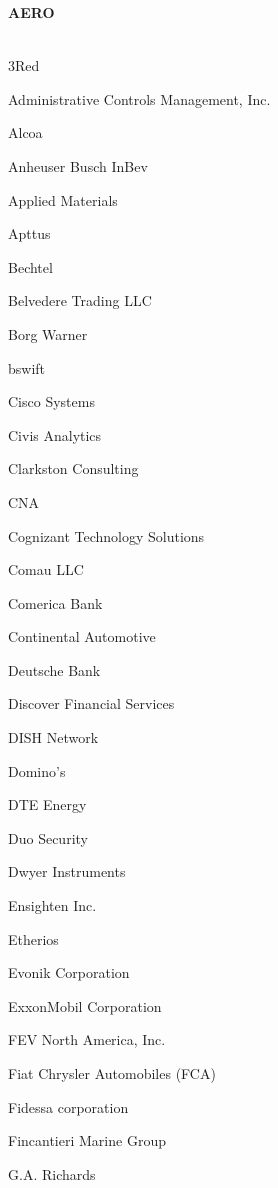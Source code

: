 \documentclass[twoside]{article}
\begin{document}
    \begin{center}\begin{multicols}{5}
    {\fontsize{14}{16}\selectfont \bf AERO}\\
        \vspace{-1em}
        ~\hrulefill~
        \vspace{-.9em}
        \begin{FlushLeft}
        \begin{compactitem}
        \item 3Red
\item Administrative Controls Management, Inc.
\item Alcoa
\item Anheuser Busch InBev
\item Applied Materials
\item Apttus
\item Bechtel
\item Belvedere Trading LLC
\item Borg Warner
\item bswift
\item Cisco Systems
\item Civis Analytics
\item Clarkston Consulting
\item CNA
\item Cognizant Technology Solutions
\item Comau LLC
\item Comerica Bank
\item Continental Automotive
\item Deutsche Bank
\item Discover Financial Services
\item DISH Network
\item Domino's
\item DTE Energy
\item Duo Security
\item Dwyer Instruments
\item Ensighten Inc.
\item Etherios
\item Evonik Corporation
\item ExxonMobil Corporation
\item FEV North America, Inc.
\item Fiat Chrysler Automobiles (FCA)
\item Fidessa corporation
\item Fincantieri Marine Group
\item G.A. Richards

\end{compactitem}
\end{FlushLeft}
\end{multicols}
\end{center}
\end{document}
